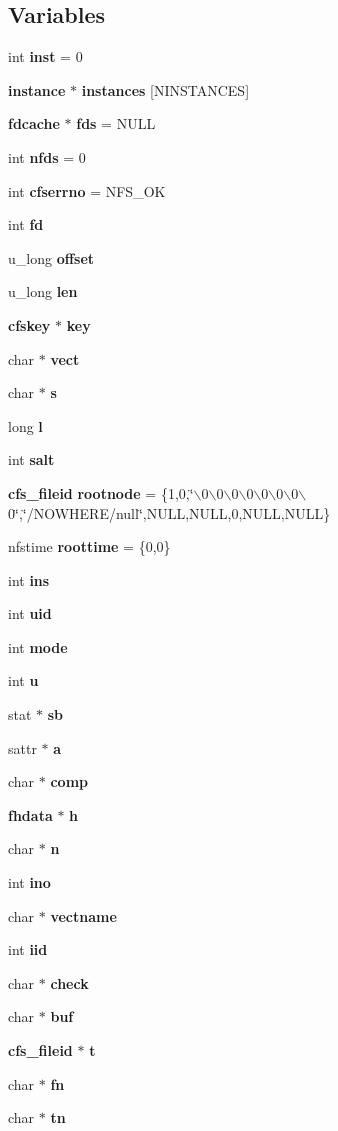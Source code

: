 \subsection*{Variables}
\begin{CompactItemize}
\item 
int {\bf inst} = 0
\item 
{\bf instance} $\ast$ {\bf instances} [NINSTANCES]
\item 
{\bf fdcache} $\ast$ {\bf fds} = NULL
\item 
int {\bf nfds} = 0
\item 
int {\bf cfserrno} = NFS\_\-OK
\item 
int {\bf fd}
\item 
u\_\-long {\bf offset}
\item 
u\_\-long {\bf len}
\item 
{\bf cfskey} $\ast$ {\bf key}
\item 
char $\ast$ {\bf vect}
\item 
char $\ast$ {\bf s}
\item 
long {\bf l}
\item 
int {\bf salt}
\item 
{\bf cfs\_\-fileid} {\bf rootnode} = \{1,0,\char`\"{}$\backslash$0$\backslash$0$\backslash$0$\backslash$0$\backslash$0$\backslash$0$\backslash$0$\backslash$0\char`\"{},\char`\"{}/NOWHERE/null\char`\"{},NULL,NULL,0,NULL,NULL\}
\item 
nfstime {\bf roottime} = \{0,0\}
\item 
int {\bf ins}
\item 
int {\bf uid}
\item 
int {\bf mode}
\item 
int {\bf u}
\item 
stat $\ast$ {\bf sb}
\item 
sattr $\ast$ {\bf a}
\item 
char $\ast$ {\bf comp}
\item 
{\bf fhdata} $\ast$ {\bf h}
\item 
char $\ast$ {\bf n}
\item 
int {\bf ino}
\item 
char $\ast$ {\bf vectname}
\item 
int {\bf iid}
\item 
char $\ast$ {\bf check}
\item 
char $\ast$ {\bf buf}
\item 
{\bf cfs\_\-fileid} $\ast$ {\bf t}
\item 
char $\ast$ {\bf fn}
\item 
char $\ast$ {\bf tn}
\end{CompactItemize}


